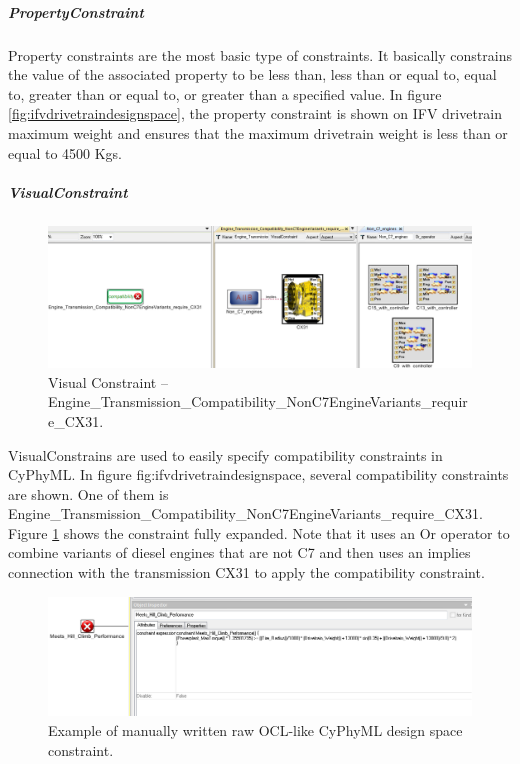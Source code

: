\subparagraph{PropertyConstraint}
Property constraints are the most basic type of constraints. It basically constrains the value of the associated property to be less than, less than or equal to, equal to, greater than or equal to, or greater than a specified value. In figure \ref{fig:ifvdrivetraindesignspace}, the property constraint is shown on IFV drivetrain maximum weight and ensures that the maximum drivetrain weight is less than or equal to 4500 Kgs.

\subparagraph{VisualConstraint}

\begin{figure}[t]
\centering
\includegraphics[scale=0.30]{Figures/DesignSpaceVisualConstraint.png}
\caption{Visual Constraint -- Engine\_Transmission\_Compatibility\_NonC7EngineVariants\_require\_CX31.}
\label{fig:designspacevisualconstraint}
\end{figure}

VisualConstrains are used to easily specify compatibility constraints in CyPhyML. In figure {fig:ifvdrivetraindesignspace}, several compatibility constraints are shown. One of them is Engine\_Transmission\_Compatibility\_NonC7EngineVariants\_require\_CX31. Figure \ref{fig:designspacevisualconstraint} shows the constraint fully expanded. Note that it uses an Or operator to combine variants of diesel engines that are not C7 and then uses an implies connection with the transmission CX31 to apply the compatibility constraint.

\begin{figure}[t]
\centering
\includegraphics[scale=0.30]{Figures/DesignSpaceTextualOCLConstraint.png}
\caption{Example of manually written raw OCL-like CyPhyML design space constraint.}
\label{fig:designspacetextualoclconstraint}
\end{figure}

